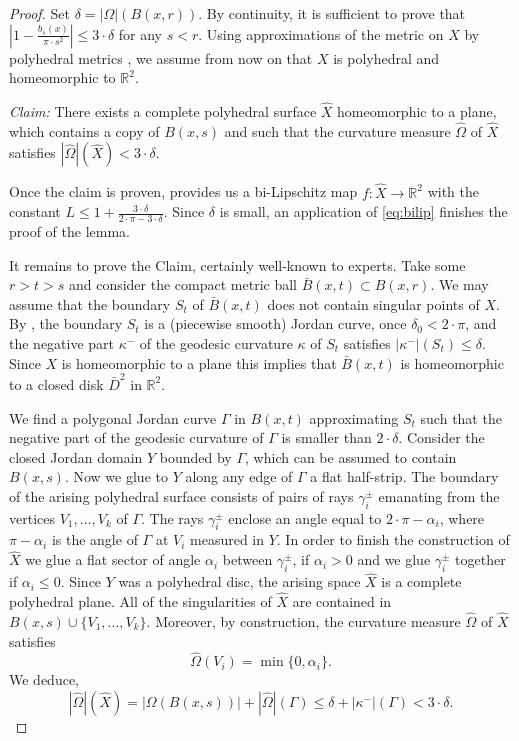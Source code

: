 \documentclass[12pt,leqno,intlimits]{amsart}
\numberwithin{equation}{section}
\theoremstyle{definition}
\theoremstyle{remark}
\newcommand{\R}{\mathbb{R}}
\def\:{\colon}
\begin{document}
\begin{proof}

Set $\delta = |\Omega |( B (x,{r}))$. By continuity, it is sufficient to prove that $|1- \frac {b_s(x)} {\pi{\cdot}s^2}| \leq 3{\cdot}\delta $ for any $s<r$. Using approximations of
the metric on $X$ by polyhedral metrics \cite[Theorem 8.4.3, Theorem 8.1.9]{Reshetnyak-GeomIV}, we assume from now on that $X$ is polyhedral and homeomorphic to $\R^2$.

\emph{Claim:} There exists a complete polyhedral surface $\hat X$ homeomorphic to a plane, which contains a copy of $B (x,s)$ and such that
the curvature measure $\hat \Omega$ of $\hat X$ satisfies $|\hat \Omega | (\hat X) < 3 \cdot \delta$.

Once the claim is proven,
\cite{Bonk-Lang} provides us a bi-Lipschitz map $f\:\hat X\to \R^2$ with the constant $L\leq 1+\frac {3{\cdot}\delta} {2{\cdot}\pi -3{\cdot}\delta}$.
Since $\delta$ is small,  an application of \eqref{eq:bilip}  finishes the proof of the lemma.


It remains to prove the Claim,  certainly well-known to experts.
Take some $r>t>s$ and consider the compact metric ball $\bar B (x,t) \subset B (x,r)$.
We may assume that the boundary $S_t$ of
$\bar B (x,t)$ does not contain singular points of $X$.
By \cite[Theorem 9.1, Theorem 9.3] {Reshetnyak-GeomIV}, the boundary $S_t$ is a (piecewise smooth) Jordan curve, once $\delta _0< 2{\cdot}\pi$, and the negative part $\kappa ^-$ of the geodesic curvature $\kappa$ of $S_t$ satisfies $|\kappa ^-| (S_t) \leq \delta$.
Since $X$ is homeomorphic to a plane this implies that $\bar B (x,t)$ is homeomorphic to a closed disk $\bar D^2$ in $\R^2$.



We find a polygonal Jordan curve $\Gamma$ in $B(x,t)$ approximating $S_t$ such that the negative part of the geodesic curvature of $\Gamma$ is smaller than $2{\cdot}\delta$. Consider the closed Jordan domain $Y$ bounded by $\Gamma$, which can be assumed to contain $B(x,s)$.
Now we glue to $Y$ along any edge of $\Gamma$ a flat half-strip.
The boundary of the arising polyhedral surface consists of pairs of rays
$\gamma _i ^{\pm}$ emanating from the vertices $V_1,\dots,V_k$ of $\Gamma$. The rays $\gamma _i^{\pm}$ enclose an angle equal to $2{\cdot}\pi- \alpha _i$, where $\pi-\alpha _i$ is the angle of $\Gamma$ at $V_i$ measured in $Y$. In order to finish the construction of $\hat X$ we glue a flat sector of
angle $\alpha _i$ between $\gamma _i ^{\pm}$, if $\alpha _i >0$ and we glue $\gamma _i^{\pm}$ together if $\alpha _i \leq 0$.
Since $Y$ was a polyhedral disc, the arising space $\hat X$ is a complete polyhedral plane.
All of the singularities of $\hat X$ are contained in $B(x,s) \cup \{ V_1,\dots, V_k\}$. Moreover, by construction, the curvature measure
$\hat \Omega$ of $\hat X$ satisfies
$$\hat \Omega (V_i) = \min \{ 0, \alpha _i \}.$$
We deduce,
$$|\hat \Omega | ( \hat X) = |\Omega (B (x,s))| + |\hat \Omega | ( \Gamma ) \leq \delta + |\kappa ^-| (\Gamma ) < 3{\cdot}\delta.$$


\end{proof}
\end{document}
